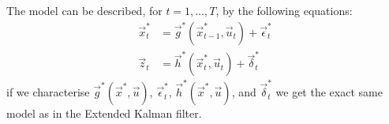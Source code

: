 The model can be described, for $t = 1, \dotsc, T$, by the following equations:
\begin{align}
	\vec x_t^\ast 	&= \vec g^\ast(\vec x_{t - 1}^\ast, \vec u_t) + \vec \epsilon_t^\ast \\
	\vec z_t 		&= \vec h^\ast(\vec x_t^\ast, \vec u_t) + \vec \delta_t^\ast
\end{align}
if we characterise $\vec g^\ast(\vec x^\ast, \vec u)$, $\vec \epsilon_t^\ast$, $\vec h^\ast(\vec x^\ast, \vec u)$, and $\vec \delta_t^\ast$ we get the exact same model as in the Extended Kalman filter.

